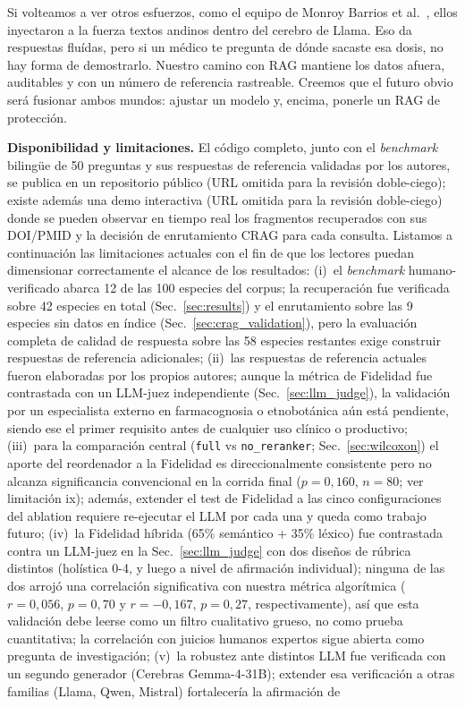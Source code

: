 \documentclass[runningheads]{llncs}
\begin{document}
Si volteamos a ver otros esfuerzos, como el equipo de Monroy Barrios et al.~\cite{monroy2026finetuning}, ellos inyectaron a la fuerza textos andinos dentro del cerebro de Llama. Eso da respuestas flu\'{i}das, pero si un m\'{e}dico te pregunta de d\'{o}nde sacaste esa dosis, no hay forma de demostrarlo. Nuestro camino con RAG mantiene los datos afuera, auditables y con un n\'{u}mero de referencia rastreable. Creemos que el futuro obvio ser\'{a} fusionar ambos mundos: ajustar un modelo y, encima, ponerle un RAG de protecci\'{o}n.

\textbf{Disponibilidad y limitaciones.} El c\'{o}digo completo, junto con el \emph{benchmark} biling\"{u}e de 50 preguntas y sus respuestas de referencia validadas por los autores, se publica en un repositorio p\'{u}blico (URL omitida para la revisi\'{o}n doble-ciego); existe adem\'{a}s una demo interactiva (URL omitida para la revisi\'{o}n doble-ciego) donde se pueden observar en tiempo real los fragmentos recuperados con sus DOI/PMID y la decisi\'{o}n de enrutamiento CRAG para cada consulta. Listamos a continuaci\'{o}n las limitaciones actuales con el fin de que los lectores puedan dimensionar correctamente el alcance de los resultados: (i)~el \emph{benchmark} humano-verificado abarca 12 de las 100 especies del corpus; la recuperaci\'{o}n fue verificada sobre 42 especies en total (Sec.~\ref{sec:results}) y el enrutamiento sobre las 9 especies sin datos en \'{i}ndice (Sec.~\ref{sec:crag_validation}), pero la evaluaci\'{o}n completa de calidad de respuesta sobre las 58 especies restantes exige construir respuestas de referencia adicionales; (ii)~las respuestas de referencia actuales fueron elaboradas por los propios autores; aunque la m\'{e}trica de Fidelidad fue contrastada con un LLM-juez independiente (Sec.~\ref{sec:llm_judge}), la validaci\'{o}n por un especialista externo en farmacognosia o etnobot\'{a}nica a\'{u}n est\'{a} pendiente, siendo ese el primer requisito antes de cualquier uso cl\'{i}nico o productivo; (iii)~para la comparaci\'{o}n central (\texttt{full} vs \texttt{no\_reranker}; Sec.~\ref{sec:wilcoxon}) el aporte del reordenador a la Fidelidad es direccionalmente consistente pero no alcanza significancia convencional en la corrida final ($p{=}0{,}160$, $n{=}80$; ver limitaci\'{o}n ix); adem\'{a}s, extender el test de Fidelidad a las cinco configuraciones del ablation requiere re-ejecutar el LLM por cada una y queda como trabajo futuro; (iv)~la Fidelidad h\'{i}brida (65\% sem\'{a}ntico + 35\% l\'{e}xico) fue contrastada contra un LLM-juez en la Sec.~\ref{sec:llm_judge} con dos dise\~{n}os de r\'{u}brica distintos (holística 0-4, y luego a nivel de afirmaci\'{o}n individual); ninguna de las dos arroj\'{o} una correlaci\'{o}n significativa con nuestra m\'{e}trica algor\'{i}tmica ($r{=}0{,}056$, $p{=}0{,}70$ y $r{=}{-}0{,}167$, $p{=}0{,}27$, respectivamente), as\'{i} que esta validaci\'{o}n debe leerse como un filtro cualitativo grueso, no como prueba cuantitativa; la correlaci\'{o}n con juicios humanos expertos sigue abierta como pregunta de investigaci\'{o}n; (v)~la robustez ante distintos LLM fue verificada con un segundo generador (Cerebras Gemma-4-31B); extender esa verificaci\'{o}n a otras familias (Llama, Qwen, Mistral) fortalecer\'{i}a la afirmaci\'{o}n de 
\end{document}
